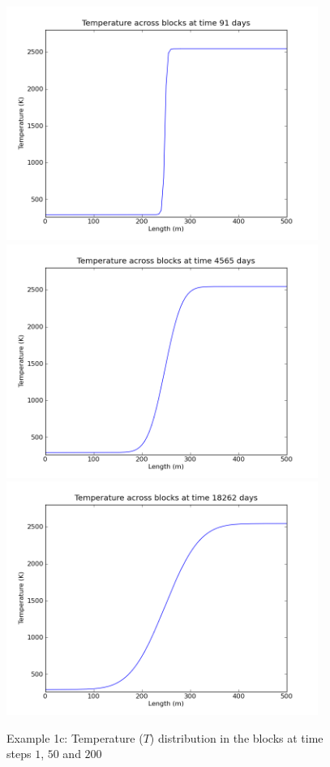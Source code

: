 \begin{figure}
\begin{center}
\includegraphics[width=4in]{figures/blockspyplot001}
\includegraphics[width=4in]{figures/blockspyplot050}
\includegraphics[width=4in]{figures/blockspyplot200}
\caption{Example 1c: Temperature ($T$) distribution in the blocks at time steps
$1$, $50$ and $200$}
\label{fig:onedheatout} 
\end{center}
\end{figure}
\clearpage

